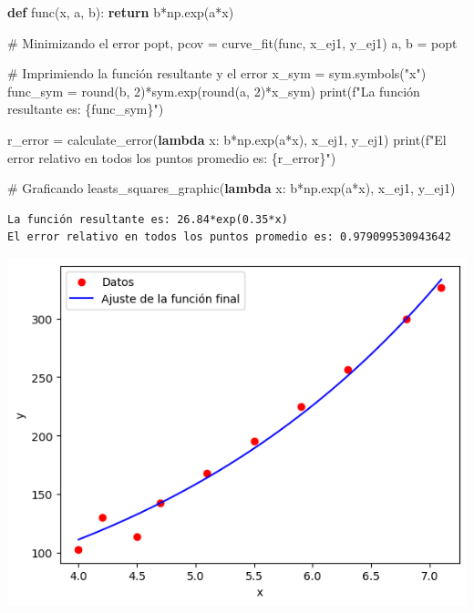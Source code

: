 \documentclass[
  letterpaper,
  DIV=11,
  numbers=noendperiod]{scrartcl}
\newenvironment{Shaded}{\begin{snugshade}}{\end{snugshade}}
\newcommand{\BuiltInTok}[1]{\textcolor[rgb]{0.00,0.23,0.31}{#1}}
\newcommand{\CommentTok}[1]{\textcolor[rgb]{0.37,0.37,0.37}{#1}}
\newcommand{\ControlFlowTok}[1]{\textcolor[rgb]{0.00,0.23,0.31}{\textbf{#1}}}
\newcommand{\DecValTok}[1]{\textcolor[rgb]{0.68,0.00,0.00}{#1}}
\newcommand{\KeywordTok}[1]{\textcolor[rgb]{0.00,0.23,0.31}{\textbf{#1}}}
\newcommand{\NormalTok}[1]{\textcolor[rgb]{0.00,0.23,0.31}{#1}}
\newcommand{\OperatorTok}[1]{\textcolor[rgb]{0.37,0.37,0.37}{#1}}
\newcommand{\SpecialCharTok}[1]{\textcolor[rgb]{0.37,0.37,0.37}{#1}}
\newcommand{\SpecialStringTok}[1]{\textcolor[rgb]{0.13,0.47,0.30}{#1}}
\newcommand{\StringTok}[1]{\textcolor[rgb]{0.13,0.47,0.30}{#1}}
\begin{document}
\begin{Shaded}
\begin{Highlighting}[]

\KeywordTok{def}\NormalTok{ func(x, a, b):}
    \ControlFlowTok{return}\NormalTok{ b}\OperatorTok{*}\NormalTok{np.exp(a}\OperatorTok{*}\NormalTok{x)}

\CommentTok{\# Minimizando el error}
\NormalTok{popt, pcov }\OperatorTok{=}\NormalTok{ curve\_fit(func, x\_ej1, y\_ej1)}
\NormalTok{a, b }\OperatorTok{=}\NormalTok{ popt}

\CommentTok{\# Imprimiendo la función resultante y el error}
\NormalTok{x\_sym }\OperatorTok{=}\NormalTok{ sym.symbols(}\StringTok{"x"}\NormalTok{)}
\NormalTok{func\_sym }\OperatorTok{=} \BuiltInTok{round}\NormalTok{(b, }\DecValTok{2}\NormalTok{)}\OperatorTok{*}\NormalTok{sym.exp(}\BuiltInTok{round}\NormalTok{(a, }\DecValTok{2}\NormalTok{)}\OperatorTok{*}\NormalTok{x\_sym)}
\BuiltInTok{print}\NormalTok{(}\SpecialStringTok{f"La función resultante es: }\SpecialCharTok{\{}\NormalTok{func\_sym}\SpecialCharTok{\}}\SpecialStringTok{"}\NormalTok{)}

\NormalTok{r\_error }\OperatorTok{=}\NormalTok{ calculate\_error(}\KeywordTok{lambda}\NormalTok{ x: b}\OperatorTok{*}\NormalTok{np.exp(a}\OperatorTok{*}\NormalTok{x), x\_ej1, y\_ej1)}
\BuiltInTok{print}\NormalTok{(}\SpecialStringTok{f"El error relativo en todos los puntos promedio es: }\SpecialCharTok{\{}\NormalTok{r\_error}\SpecialCharTok{\}}\SpecialStringTok{"}\NormalTok{)}

\CommentTok{\# Graficando}
\NormalTok{leasts\_squares\_graphic(}\KeywordTok{lambda}\NormalTok{ x: b}\OperatorTok{*}\NormalTok{np.exp(a}\OperatorTok{*}\NormalTok{x), x\_ej1, y\_ej1)}
\end{Highlighting}
\end{Shaded}

\begin{verbatim}
La función resultante es: 26.84*exp(0.35*x)
El error relativo en todos los puntos promedio es: 0.979099530943642
\end{verbatim}

\includegraphics{Tarea8_MN_files/figure-pdf/cell-7-output-2.png}
\end{document}
